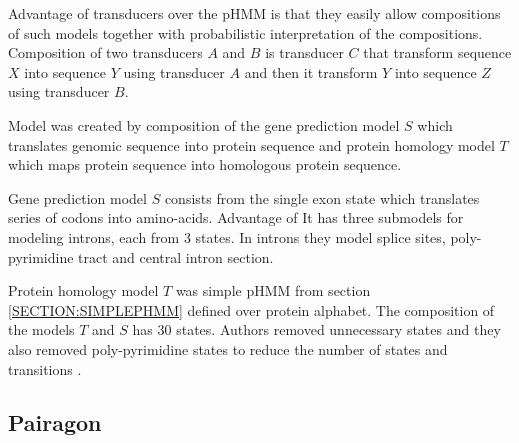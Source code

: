 Advantage of transducers over the pHMM is that they easily allow compositions of
such models together with probabilistic interpretation of the compositions.
Composition of two transducers $A$ and $B$ is transducer $C$ that transform
sequence $X$ into sequence $Y$ using transducer $A$ and then it transform $Y$
into sequence $Z$ using transducer $B$. %

Model was created by composition of the gene prediction model $S$ which
translates genomic sequence into protein sequence and protein homology model $T$
which maps protein sequence into homologous protein sequence.

Gene prediction model $S$ consists from the single exon state which translates
series of codons into amino-acids. Advantage of It has three submodels for
modeling introns, each from $3$ states. In introns they model splice sites, 
poly-pyrimidine tract and central intron section.

Protein homology model $T$ was simple pHMM from section \ref{SECTION:SIMPLEPHMM}
defined over protein alphabet.  The composition of the models $T$ and $S$ has
$30$ states. Authors removed unnecessary states and they also removed
poly-pyrimidine states to reduce the number of states and transitions
\cite{GeneWise2004}.




\subsection{Pairagon}

